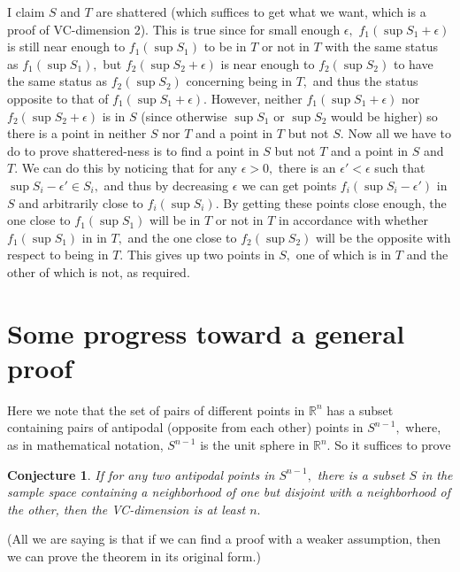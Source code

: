 \documentclass[12pt]{amsart}
\newcommand{\0}{\mat{0}}
\newcommand{\1}{\mathds{1}}
\newtheorem{conjecture}[theorem]{Conjecture}
\begin{document}
I claim $S$ and $T$ are shattered (which suffices to get what we want, which is a proof of VC-dimension $2$). This is true since for small enough $\epsilon,$ $f_1(\sup S_1 + \epsilon)$ is still near enough to $f_1(\sup S_1)$ to be in $T$ or not in $T$ with the same status as $f_1(\sup S_1),$ but $f_2(\sup S_2 + \epsilon)$ is near enough to $f_2(\sup S_2)$ to have the same status as $f_2(\sup S_2)$  concerning being in $T,$ and thus the status opposite to that of $f_1(\sup S_1 + \epsilon).$ However, neither $f_1(\sup S_1 + \epsilon)$ nor $f_2(\sup S_2 + \epsilon)$ is in $S$ (since otherwise $\sup S_1$ or $\sup S_2$ would be higher) so there is a point in neither $S$ nor $T$ and a point in $T$ but not $S.$ Now all we have to do to prove shattered-ness is to find a point in $S$ but not $T$ and a point in $S$ and $T.$ We can do this by noticing that for any $\epsilon > 0,$ there is an $\epsilon' < \epsilon$ such that $\sup S_i - \epsilon' \in S_i,$ and thus by decreasing $\epsilon$ we can get points $f_i(\sup S_i - \epsilon')$ in $S$ and arbitrarily close to $f_i(\sup S_i).$ By getting these points close enough, the one close to $f_1(\sup S_1)$ will be in $T$ or not in $T$ in accordance with whether $f_1(\sup S_1)$ in in $T,$ and the one close to $f_2(\sup S_2)$ will be the opposite with respect to being in $T.$ This gives up two points in $S,$ one of which is in $T$ and the other of which is not, as required.

\section{Some progress toward a general proof}
Here we note that the set of pairs of different points in $\mathbb{R}^n$ has a subset containing pairs of antipodal (opposite from each other) points in $S^{n - 1},$ where, as in mathematical notation, $S^{n - 1}$ is the unit sphere in $\mathbb{R}^n.$ So it suffices to prove
\begin{conjecture}
If for any two antipodal points in $S^{n - 1},$ there is a subset $S$ in the sample space containing a neighborhood of one but disjoint with a neighborhood of the other, then the VC-dimension is at least $n.$
\end{conjecture}
(All we are saying is that if we can find a proof with a weaker assumption, then we can prove the theorem in its original form.)
\end{document}
